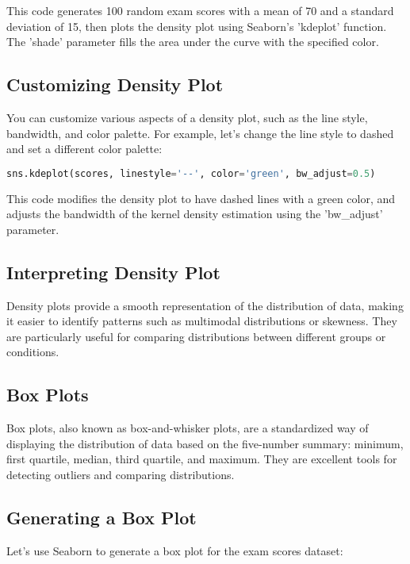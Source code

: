 This code generates 100 random exam scores with a mean of 70 and a standard deviation of 15, then plots the density plot using Seaborn's 'kdeplot' function. The 'shade' parameter fills the area under the curve with the specified color.

\subsection*{Customizing Density Plot}

You can customize various aspects of a density plot, such as the line style, bandwidth, and color palette. For example, let's change the line style to dashed and set a different color palette:

\begin{lstlisting}[language=Python, caption={Customizing Density Plot}]
	sns.kdeplot(scores, linestyle='--', color='green', bw_adjust=0.5)
\end{lstlisting}

This code modifies the density plot to have dashed lines with a green color, and adjusts the bandwidth of the kernel density estimation using the 'bw\_adjust' parameter.

\subsection*{Interpreting Density Plot}

Density plots provide a smooth representation of the distribution of data, making it easier to identify patterns such as multimodal distributions or skewness. They are particularly useful for comparing distributions between different groups or conditions.

\subsection{Box Plots}

Box plots, also known as box-and-whisker plots, are a standardized way of displaying the distribution of data based on the five-number summary: minimum, first quartile, median, third quartile, and maximum. They are excellent tools for detecting outliers and comparing distributions.

\subsection*{Generating a Box Plot}

Let's use Seaborn to generate a box plot for the exam scores dataset:

